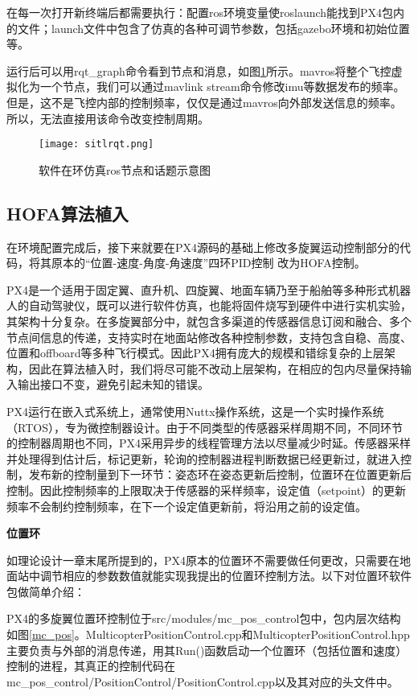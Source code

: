 在每一次打开新终端后都需要执行：配置ros环境变量使roslaunch能找到PX4包内的文件；launch文件中包含了仿真的各种可调节参数，包括gazebo环境和初始位置等。

运行后可以用rqt\_graph命令看到节点和消息，如图\ref{sitlrqt}所示。mavros将整个飞控虚拟化为一个节点，我们可以通过mavlink stream命令修改imu等数据发布的频率。但是，这不是飞控内部的控制频率，仅仅是通过mavros向外部发送信息的频率。所以，无法直接用该命令改变控制周期。
\begin{figure}[!h]
  \centering
  \texttt{[image: sitlrqt.png]}
  \caption{软件在环仿真ros节点和话题示意图}
  \label{sitlrqt}
\end{figure}

 \subsection{HOFA算法植入}
在环境配置完成后，接下来就要在PX4源码的基础上修改多旋翼运动控制部分的代码，将其原本的“位置-速度-角度-角速度”四环PID控制 \cite{px4控制}改为HOFA控制。

PX4是一个适用于固定翼、直升机、四旋翼、地面车辆乃至于船舶等多种形式机器人的自动驾驶仪，既可以进行软件仿真，也能将固件烧写到硬件中进行实机实验，其架构十分复杂。在多旋翼部分中，就包含多渠道的传感器信息订阅和融合、多个节点间信息的传递，支持实时在地面站修改各种控制参数，支持包含自稳、高度、位置和offboard等多种飞行模式。因此PX4拥有庞大的规模和错综复杂的上层架构，因此在算法植入时，我们将尽可能不改动上层架构，在相应的包内尽量保持输入输出接口不变，避免引起未知的错误。

PX4运行在嵌入式系统上，通常使用Nuttx操作系统，这是一个实时操作系统（RTOS），专为微控制器设计。由于不同类型的传感器采样周期不同，不同环节的控制器周期也不同，PX4采用异步的线程管理方法以尽量减少时延。传感器采样并处理得到估计后，标记更新，轮询的控制器进程判断数据已经更新过，就进入控制，发布新的控制量到下一环节：姿态环在姿态更新后控制，位置环在位置更新后控制。因此控制频率的上限取决于传感器的采样频率，设定值（setpoint）的更新频率不会制约控制频率，在下一个设定值更新前，将沿用之前的设定值。

\textbf{位置环}

如理论设计一章末尾所提到的，PX4原本的位置环不需要做任何更改，只需要在地面站中调节相应的参数数值就能实现我提出的位置环控制方法。以下对位置环软件包做简单介绍：

PX4的多旋翼位置环控制位于src/modules/mc\_pos\_control包中，包内层次结构如图\ref{mc_pos}。MulticopterPositionControl.cpp和MulticopterPositionControl.hpp主要负责与外部的消息传递，用其Run()函数启动一个位置环（包括位置和速度）控制的进程，其真正的控制代码在mc\_pos\_control/PositionControl/PositionControl.cpp以及其对应的头文件中。

